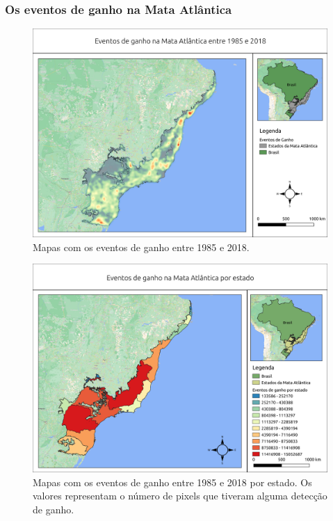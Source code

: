 \subsubsection{Os eventos de ganho na Mata Atlântica}

\begin{figure}[H]
    \centering
    \includegraphics[scale=.5]{images/heatmap_gain_masked18_dur_gt4_inv_for.png}
    \caption{Mapas com os eventos de ganho entre 1985 e 2018.}
    \label{fig:heat_gain}
\end{figure}

\begin{figure}[H]
    \centering
    \includegraphics[scale=.5]{images/estados_gain_seg6_masked18_dur_gt4_inv_for.png}
    \caption{Mapas com os eventos de ganho entre 1985 e 2018 por estado. Os valores representam o número de pixels que tiveram alguma detecção de ganho.}
    \label{fig:estados_gain}
\end{figure}


